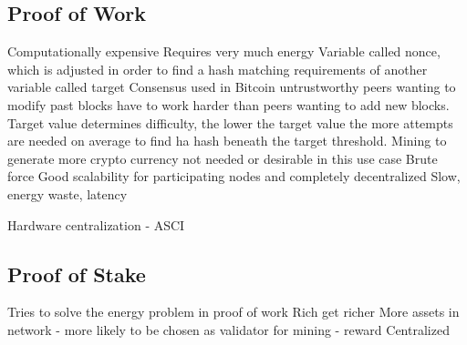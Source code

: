 

\subsection{Proof of Work}
Computationally expensive
Requires very much energy
Variable called nonce, which is adjusted in order to find a hash matching requirements of another variable called target
Consensus used in Bitcoin
untrustworthy peers wanting to modify past blocks have to work harder than peers wanting to add new blocks. 
Target value determines difficulty, the lower the target value the more attempts are needed on average to find ha hash beneath the target threshold. 
Mining to generate more crypto currency not needed or desirable in this use case 
Brute force
Good scalability for participating nodes and completely decentralized 
Slow, energy waste, latency 

Hardware centralization - ASCI



\subsection{Proof of Stake}
Tries to solve the energy problem in proof of work
Rich get richer
More assets in network - more likely to be chosen as validator for mining - reward
Centralized

